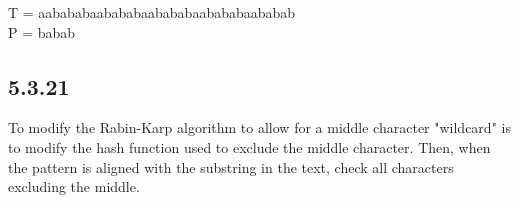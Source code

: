 \documentclass[12pt]{article}
\begin{document}
\noindent T = aabababaabababaabababaabababaababab\\
P = babab\\

\subsection*{5.3.21}
To modify the Rabin-Karp algorithm to allow for a middle character "wildcard"
is to modify the hash function used to exclude the middle character. Then,
when the pattern is aligned with the substring in the text, check all characters
excluding the middle.
\end{document}
